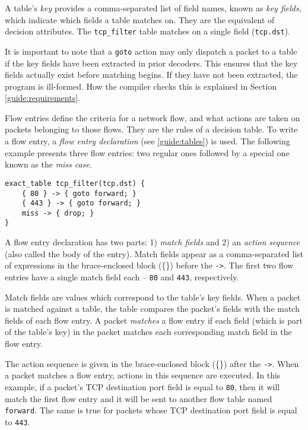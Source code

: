 A table's \textit{key} provides a comma-separated list of field names, known as
\textit{key fields}, which indicate which fields a table matches on.
They are the equivalent of decision attributes. 
The \texttt{tcp\_filter} table matches on a single field (\texttt{tcp.dst}).

It is important to note that a \texttt{goto} action may only dispatch
a packet to a table if the key fields have been extracted in prior decoders. This ensures that the key fields actually exist before matching begins. If they have not been extracted, the program is ill-formed. How the compiler checks this is explained in Section \ref{guide:requirements}.

Flow entries define the criteria for a network flow, and
what actions are taken on packets belonging to those flows.
They are the rules of a decision table.
To write a flow entry, a \textit{flow entry declaration}
(see \ref{guide:tables}) is used.
The following example presents three flow entries:
two regular ones followed by a special one known as the \emph{miss case}.

\begin{codepage}
\begin{lstlisting}
exact_table tcp_filter(tcp.dst) {
	{ 80 } -> { goto forward; }
	{ 443 } -> { goto forward; }
	miss -> { drop; }
}
\end{lstlisting}
\end{codepage}

A flow entry declaration has two parts: 1) \textit{match
fields} and 2) an \textit{action sequence} (also called the body of the entry). 
Match fields appear as a comma-separated list of expressions 
in the brace-enclosed block (\{\}) before the \texttt{->}. 
The first two flow entries have a single match field each --
\texttt{80} and \texttt{443}, respectively.

Match fields are values which correspond to the table's key fields. 
When a packet is matched against a table,
the table compares the packet's fields with the match fields of each flow entry.
A packet \textit{matches} a flow entry if each field (which is part of the
table's key) in the packet matches each corresponding match field in the flow 
entry. 

The action sequence is given in the brace-enclosed block (\{\}) after the \texttt{->}. When a packet matches a flow entry, actions in this
sequence are executed.
In this example, if a packet's TCP destination port field is equal to \texttt{80},
then it will match the first flow entry and it will be sent to another flow table
named \texttt{forward}. The same is true for packets whose TCP destination
port field is equal to \texttt{443}.

